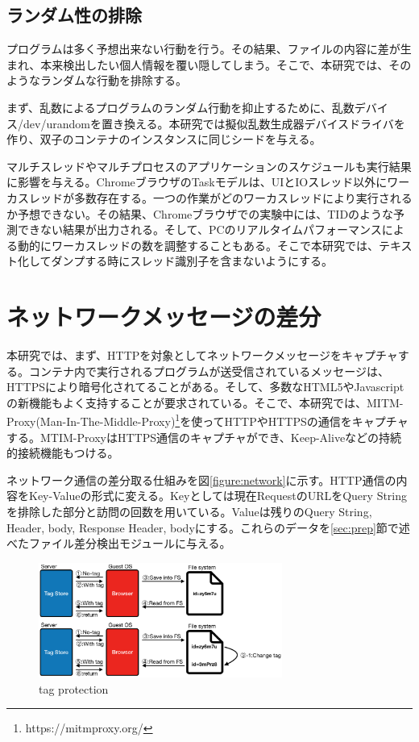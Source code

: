 \documentclass[a4paper,twocolumn,10pt]{jarticle}
\begin{document}
\subsection{ランダム性の排除}

プログラムは多く予想出来ない行動を行う。その結果、ファイルの内容に差が生まれ、本来検出したい個人情報を覆い隠してしまう。そこで、本研究では、そのようなランダムな行動を排除する。

まず、乱数によるプログラムのランダム行動を抑止するために、乱数デバイス/dev/urandomを置き換える。本研究では擬似乱数生成器デバイスドライバを作り、双子のコンテナのインスタンスに同じシードを与える。

マルチスレッドやマルチプロセスのアプリケーションのスケジュールも実行結果に影響を与える。ChromeブラウザのTaskモデルは、UIとIOスレッド以外にワーカスレッドが多数存在する。一つの作業がどのワーカスレッドにより実行されるか予想できない。その結果、Chromeブラウザでの実験中には、TIDのような予測できない結果が出力される。そして、PCのリアルタイムパフォーマンスによる動的にワーカスレッドの数を調整することもある。そこで本研究では、テキスト化してダンプする時にスレッド識別子を含まないようにする。

\section{ネットワークメッセージの差分}
\label{sec:net}
本研究では、まず、HTTPを対象としてネットワークメッセージをキャプチャする。コンテナ内で実行されるプログラムが送受信されているメッセージは、HTTPSにより暗号化されてることがある。そして、多数なHTML5やJavascriptの新機能もよく支持することが要求されている。そこで、本研究では、MITM-Proxy(Man-In-The-Middle-Proxy)\footnote{https://mitmproxy.org/}を使ってHTTPやHTTPSの通信をキャプチャする。MTIM-ProxyはHTTPS通信のキャプチャができ、Keep-Aliveなどの持続的接続機能もつける。

ネットワーク通信の差分取る仕組みを図\ref{figure:network}に示す。HTTP通信の内容をKey-Valueの形式に変える。Keyとしては現在RequestのURLをQuery Stringを排除した部分と訪問の回数を用いている。Valueは残りのQuery String, Header, body, Response Header, bodyにする。これらのデータを\ref{sec:prep}節で述べたファイル差分検出モジュールに与える。


\begin{figure}[ht]
\begin{center}
\includegraphics[width=8cm]{img/tag.eps}
\caption{tag protection}
\label{figure:tag}
\end{center}
\end{figure}
\end{document}
